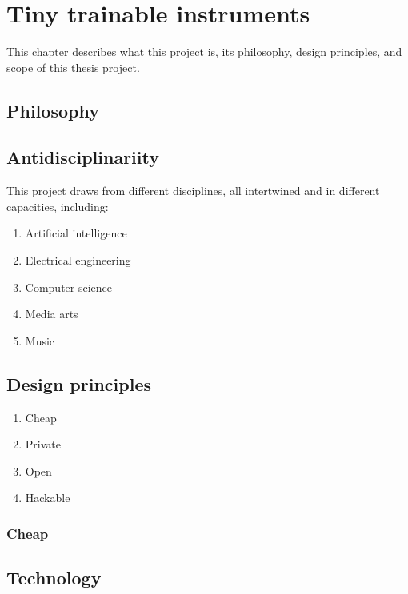 \chapter{Tiny trainable instruments}

This chapter describes what this project is, its philosophy, design principles, and scope of this thesis project.

\section{}


\section{Philosophy}


\section{Antidisciplinariity}

This project draws from different disciplines, all intertwined and in different capacities, including:

\begin{enumerate}
  \item Artificial intelligence
  \item Electrical engineering
  \item Computer science
  \item Media arts
  \item Music
\end{enumerate}

\section{Design principles}

\begin{enumerate}
  \item Cheap
  \item Private
  \item Open
  \item Hackable
\end{enumerate}

\subsection{Cheap}



\section{Technology}

